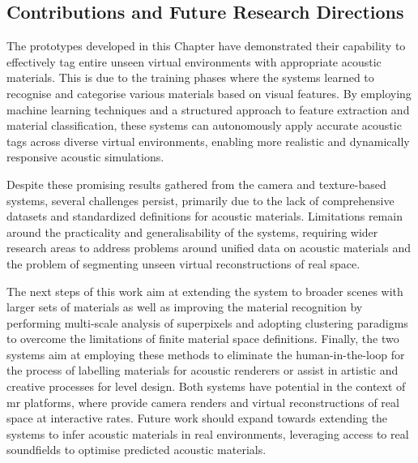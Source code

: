 \subsection{Contributions and Future Research Directions}
The prototypes developed in this Chapter have demonstrated their capability to effectively tag entire unseen virtual environments with appropriate acoustic materials. This is due to the training phases where the systems learned to recognise and categorise various materials based on visual features. By employing machine learning techniques and a structured approach to feature extraction and material classification, these systems can autonomously apply accurate acoustic tags across diverse virtual environments, enabling more realistic and dynamically responsive acoustic simulations.\par
Despite these promising results gathered from the camera and texture-based systems, several challenges persist, primarily due to the lack of comprehensive datasets and standardized definitions for acoustic materials. Limitations remain around the practicality and generalisability of the systems, requiring wider research areas to address problems around unified data on acoustic materials and the problem of segmenting unseen virtual reconstructions of real space. \par

The next steps of this work aim at extending the system to broader scenes with larger sets of materials as well as improving the material recognition by performing multi-scale analysis of superpixels and adopting clustering paradigms to overcome the limitations of finite material space definitions. Finally, the two systems aim at employing these methods to eliminate the human-in-the-loop for the process of labelling materials for acoustic renderers or assist in artistic and creative processes for level design. 
Both systems have potential in the context of \acrshort{mr} platforms, where  provide camera renders and virtual reconstructions of real space at interactive rates. Future work should expand towards extending the systems to infer acoustic materials in real environments, leveraging access to real soundfields to optimise predicted acoustic materials.


